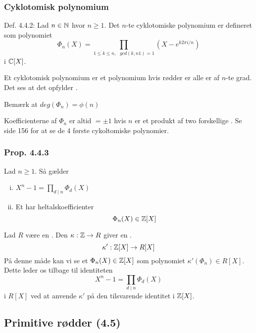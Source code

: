 \subsubsection{Cyklotomisk polynomium}
\label{Cyklotomisk polynomium}
Def. 4.4.2: Lad $n \in \mathbb{N}$ hvor $n \geq 1$. Det $n$-te cyklotomiske polynomium
er defineret som polynomiet
\begin{equation*}
  \Phi_n(X) = \prod_{1 \leq k \leq n,\text{ } gcd(k,n1)=1} (X - e^{k2\pi i/n})
\end{equation*}
i $\mathbb{C}[X]$.

Et cyklotomisk polynomium er et polynomium hvis rødder er alle
er af $n$-te grad. Det ses at det opfylder
.

Bemærk at $deg(\Phi_n) = \phi(n)$

Koefficienterne af $\Phi_n$ er altid $= \pm 1$ hvis $n$ er et produkt af two
forskellige . Se side 156 for at se de 4 første cykoltomiske
polynomier.

\subsubsection{Prop. 4.4.3}
\label{Prop. 4.4.3}
Lad $n \geq 1$. Så gælder
\begin{enumerate}[(i)]
  \item $X^n - 1 = \prod_{d\mid n} \Phi_d(X)$
  \item Et  har heltalskoefficienter
  \begin{equation*}
    \Phi_n(X) \in \mathbb{Z}[X]
  \end{equation*}
\end{enumerate}

Lad $R$ være en . Den 
$\kappa: \mathbb{Z} \rightarrow R$ giver en .
\begin{equation*}
  \kappa': \mathbb{Z}[X] \rightarrow R[X]
\end{equation*}
På denne måde kan vi se et  $\Phi_n (X) \in
\mathbb{Z}[X]$ som polynomiet $\kappa'(\Phi_n) \in R[X]$. Dette leder os tilbage til
identiteten
\begin{equation*}
  X^n - 1 = \prod_{d\mid n} \Phi_d(X)
\end{equation*}
i $R[X]$ ved at anvende $\kappa'$ på den tilsvarende identitet i $\mathbb{Z}[X]$.

\subsection{Primitive rødder (4.5)}
\label{Primitive roedder (4.5)}

